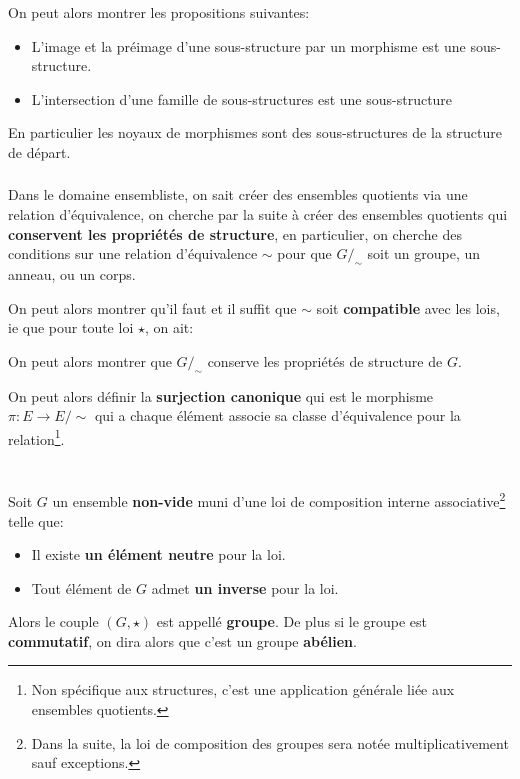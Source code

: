 On peut alors montrer les propositions suivantes:
\begin{itemize}
   \item L'image et la préimage d'une sous-structure par un morphisme est une sous-structure.
   \item L'intersection d'une famille de sous-structures est une sous-structure
\end{itemize}
En particulier les noyaux de morphismes sont des sous-structures de la structure de départ.
\subsection*{}
Dans le domaine ensembliste, on sait créer des ensembles quotients via une relation d'équivalence, on cherche par la suite à créer des ensembles quotients qui \textbf{conservent les propriétés de structure}, en particulier, on cherche des conditions sur une relation d'équivalence \(\sim\) pour que \(G/_\sim\) soit un groupe, un anneau, ou un corps.

On peut alors montrer qu'il faut et il suffit que \(\sim\) soit \textbf{compatible} avec les lois, ie que pour toute loi \(\star\), on ait:

On peut alors montrer que \(G/_\sim\) conserve les propriétés de structure de \(G\).\<

On peut alors définir la \textbf{surjection canonique} qui est le morphisme \(\pi : E \rightarrow E /\sim\) qui a chaque élément associe sa classe d'équivalence pour la relation\footnote[1]{Non spécifique aux structures, c'est une application générale liée aux ensembles quotients.}. 
\chapter*{}

Soit \(G\) un ensemble \textbf{non-vide} muni d'une loi de composition interne associative\footnote[1]{Dans la suite, la loi de composition des groupes sera notée multiplicativement sauf exceptions.} telle que:
\begin{itemize}
   \item Il existe \textbf{un élément neutre} pour la loi.
   \item Tout élément de \(G\) admet \textbf{un inverse} pour la loi.
\end{itemize}
Alors le couple \((G, \star)\) est appellé \textbf{groupe}. De plus si le groupe est \textbf{commutatif}, on dira alors que c'est un groupe \textbf{abélien}.\<

